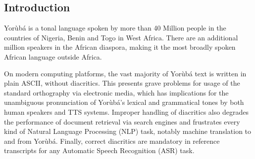 \documentclass[a0,landscape]{a0poster}
\begin{document}
\begin{multicols}{4} %


\color{Navy} %

\begin{abstract}

Yor{\`u}b{\'a} is a widely spoken West African language with a writing system rich in tonal and orthographic diacritics. With very few exceptions, diacritics are omitted from electronic texts, due to limited device and application support. Diacritics provide morphological information, are crucial for lexical disambiguation, pronunciation and are vital for any Yor{\`u}b{\'a} text-to-speech (TTS), automatic speech recognition (ASR) and natural language processing (NLP) tasks. Reframing Automatic Diacritic Restoration (ADR) as a machine translation task, we experiment with two different attentive Sequence-to-Sequence neural models to process undiacritized text. On our evaluation dataset, this approach produces diacritization error rates of less than 5\%. We have released pre-trained models, datasets and source-code as an open-source project to advance efforts on Yor{\`u}b{\'a} language technology.

\end{abstract}


\color{SaddleBrown} %

\section*{Introduction}

Yor{\`u}b{\'a} is a tonal language spoken by more than 40 Million people in the countries of Nigeria, Benin and Togo in West Africa. There are an additional million speakers in the African diaspora, making it the most broadly spoken African language outside Africa. 

On modern computing platforms, the vast majority of Yor{\`u}b{\'a} text is written in plain ASCII, without diacritics. This presents grave problems for usage of the standard orthography via electronic media, which has implications for the unambiguous pronunciation of Yor{\`u}b{\'a}'s lexical and grammatical tones by both human speakers and TTS systems. Improper handling of diacritics also degrades the performance of document retrieval via search engines and frustrates every kind of Natural Language Processing (NLP) task, notably machine translation to and from Yor{\`u}b{\'a}. Finally, correct diacritics are mandatory in reference transcripts for any Automatic Speech Recognition (ASR) task.


\end{multicols}
\end{document}
